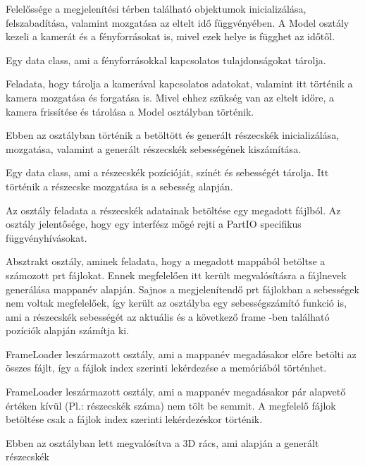 \begin{description}[font=\normalfont\itshape\space]
\item[Model:] 
Felelőssége a megjelenítési térben található objektumok inicializálása, 
felszabadítása, valamint mozgatása az eltelt idő függvényében. 
A Model osztály kezeli a kamerát és a fényforrásokat is,
mivel ezek helye is függhet az időtől.
\item[LightSource:] 
Egy data class, 
ami a fényforrásokkal kapcsolatos tulajdonságokat tárolja. 
\item[Camera:] 
Feladata, hogy tárolja a kamerával kapcsolatos adatokat, 
valamint itt történik a kamera mozgatása és forgatása is.
Mivel ehhez szükség van az eltelt időre, 
a kamera frissítése és 
tárolása a {\ttfamily Model} osztályban történik.
\item[ParticleSystem:] 
Ebben az osztályban történik a betöltött és generált részecskék 
inicializálása, mozgatása, 
valamint a generált részecskék sebességének kiszámítása.
\item[Particle:] 
Egy data class, 
ami a részecskék pozícióját, 
színét és sebességét tárolja. 
Itt történik a részecske mozgatása is 
a sebesség alapján.
\item[ParticleArrayLoader:] 
Az osztály feladata a részecskék adatainak betöltése 
egy megadott fájlból.
Az osztály jelentősége, 
hogy egy interfész mögé rejti
a PartIO specifikus függvényhívásokat.
\item[FrameLoader:] 
Absztrakt osztály, aminek feladata, 
hogy a megadott mappából betöltse a számozott prt fájlokat. 
Ennek megfelelően itt került megvalósításra
a fájlnevek generálása mappanév alapján. 
Sajnos a megjelenítendő prt fájlokban a sebességek nem voltak megfelelőek, 
így került az osztályba egy sebességszámító funkció is, 
ami a részecskék sebességét az aktuális 
és a következő frame -ben található pozíciók alapján számítja ki.
\item[LoadBeforeFrameLoader:] 
{\ttfamily FrameLoader} leszármazott osztály, 
ami a mappanév megadásakor előre betölti az összes fájlt, 
így a fájlok index szerinti lekérdezése a memóriából történhet.
\item[LoadRuntimeFrameLoader:] 
{\ttfamily FrameLoader} leszármazott osztály, 
ami a mappanév megadásakor pár alapvető értéken kívül (Pl.: részecskék száma) 
nem tölt be semmit. 
A megfelelő fájlok betöltése csak a fájlok index szerinti lekérdezéskor történik.
\item[Array3D:] Ebben az osztályban lett megvalósítva a 3D rács, 
ami alapján a generált részecskék 

\end{description}
